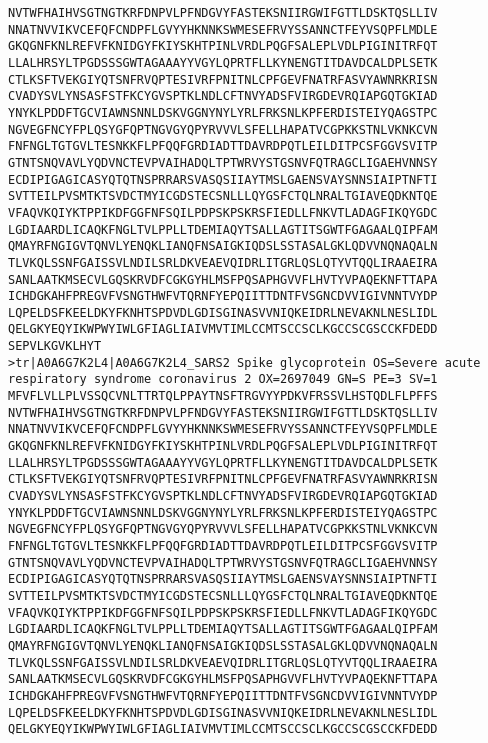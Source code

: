 \documentclass[en,black,12pt,normal]{elegantnote}
\begin{document}
\begin{lstlisting}
NVTWFHAIHVSGTNGTKRFDNPVLPFNDGVYFASTEKSNIIRGWIFGTTLDSKTQSLLIV
NNATNVVIKVCEFQFCNDPFLGVYYHKNNKSWMESEFRVYSSANNCTFEYVSQPFLMDLE
GKQGNFKNLREFVFKNIDGYFKIYSKHTPINLVRDLPQGFSALEPLVDLPIGINITRFQT
LLALHRSYLTPGDSSSGWTAGAAAYYVGYLQPRTFLLKYNENGTITDAVDCALDPLSETK
CTLKSFTVEKGIYQTSNFRVQPTESIVRFPNITNLCPFGEVFNATRFASVYAWNRKRISN
CVADYSVLYNSASFSTFKCYGVSPTKLNDLCFTNVYADSFVIRGDEVRQIAPGQTGKIAD
YNYKLPDDFTGCVIAWNSNNLDSKVGGNYNYLYRLFRKSNLKPFERDISTEIYQAGSTPC
NGVEGFNCYFPLQSYGFQPTNGVGYQPYRVVVLSFELLHAPATVCGPKKSTNLVKNKCVN
FNFNGLTGTGVLTESNKKFLPFQQFGRDIADTTDAVRDPQTLEILDITPCSFGGVSVITP
GTNTSNQVAVLYQDVNCTEVPVAIHADQLTPTWRVYSTGSNVFQTRAGCLIGAEHVNNSY
ECDIPIGAGICASYQTQTNSPRRARSVASQSIIAYTMSLGAENSVAYSNNSIAIPTNFTI
SVTTEILPVSMTKTSVDCTMYICGDSTECSNLLLQYGSFCTQLNRALTGIAVEQDKNTQE
VFAQVKQIYKTPPIKDFGGFNFSQILPDPSKPSKRSFIEDLLFNKVTLADAGFIKQYGDC
LGDIAARDLICAQKFNGLTVLPPLLTDEMIAQYTSALLAGTITSGWTFGAGAALQIPFAM
QMAYRFNGIGVTQNVLYENQKLIANQFNSAIGKIQDSLSSTASALGKLQDVVNQNAQALN
TLVKQLSSNFGAISSVLNDILSRLDKVEAEVQIDRLITGRLQSLQTYVTQQLIRAAEIRA
SANLAATKMSECVLGQSKRVDFCGKGYHLMSFPQSAPHGVVFLHVTYVPAQEKNFTTAPA
ICHDGKAHFPREGVFVSNGTHWFVTQRNFYEPQIITTDNTFVSGNCDVVIGIVNNTVYDP
LQPELDSFKEELDKYFKNHTSPDVDLGDISGINASVVNIQKEIDRLNEVAKNLNESLIDL
QELGKYEQYIKWPWYIWLGFIAGLIAIVMVTIMLCCMTSCCSCLKGCCSCGSCCKFDEDD
SEPVLKGVKLHYT
>tr|A0A6G7K2L4|A0A6G7K2L4_SARS2 Spike glycoprotein OS=Severe acute respiratory syndrome coronavirus 2 OX=2697049 GN=S PE=3 SV=1
MFVFLVLLPLVSSQCVNLTTRTQLPPAYTNSFTRGVYYPDKVFRSSVLHSTQDLFLPFFS
NVTWFHAIHVSGTNGTKRFDNPVLPFNDGVYFASTEKSNIIRGWIFGTTLDSKTQSLLIV
NNATNVVIKVCEFQFCNDPFLGVYYHKNNKSWMESEFRVYSSANNCTFEYVSQPFLMDLE
GKQGNFKNLREFVFKNIDGYFKIYSKHTPINLVRDLPQGFSALEPLVDLPIGINITRFQT
LLALHRSYLTPGDSSSGWTAGAAAYYVGYLQPRTFLLKYNENGTITDAVDCALDPLSETK
CTLKSFTVEKGIYQTSNFRVQPTESIVRFPNITNLCPFGEVFNATRFASVYAWNRKRISN
CVADYSVLYNSASFSTFKCYGVSPTKLNDLCFTNVYADSFVIRGDEVRQIAPGQTGKIAD
YNYKLPDDFTGCVIAWNSNNLDSKVGGNYNYLYRLFRKSNLKPFERDISTEIYQAGSTPC
NGVEGFNCYFPLQSYGFQPTNGVGYQPYRVVVLSFELLHAPATVCGPKKSTNLVKNKCVN
FNFNGLTGTGVLTESNKKFLPFQQFGRDIADTTDAVRDPQTLEILDITPCSFGGVSVITP
GTNTSNQVAVLYQDVNCTEVPVAIHADQLTPTWRVYSTGSNVFQTRAGCLIGAEHVNNSY
ECDIPIGAGICASYQTQTNSPRRARSVASQSIIAYTMSLGAENSVAYSNNSIAIPTNFTI
SVTTEILPVSMTKTSVDCTMYICGDSTECSNLLLQYGSFCTQLNRALTGIAVEQDKNTQE
VFAQVKQIYKTPPIKDFGGFNFSQILPDPSKPSKRSFIEDLLFNKVTLADAGFIKQYGDC
LGDIAARDLICAQKFNGLTVLPPLLTDEMIAQYTSALLAGTITSGWTFGAGAALQIPFAM
QMAYRFNGIGVTQNVLYENQKLIANQFNSAIGKIQDSLSSTASALGKLQDVVNQNAQALN
TLVKQLSSNFGAISSVLNDILSRLDKVEAEVQIDRLITGRLQSLQTYVTQQLIRAAEIRA
SANLAATKMSECVLGQSKRVDFCGKGYHLMSFPQSAPHGVVFLHVTYVPAQEKNFTTAPA
ICHDGKAHFPREGVFVSNGTHWFVTQRNFYEPQIITTDNTFVSGNCDVVIGIVNNTVYDP
LQPELDSFKEELDKYFKNHTSPDVDLGDISGINASVVNIQKEIDRLNEVAKNLNESLIDL
QELGKYEQYIKWPWYIWLGFIAGLIAIVMVTIMLCCMTSCCSCLKGCCSCGSCCKFDEDD

\end{lstlisting}
\end{document}
